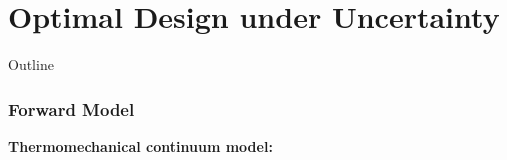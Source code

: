 \documentclass[10pt,xcolor=dvipsnames,compress]{beamer}
\begin{document}


\section{Optimal Design under Uncertainty}
\begin{frame}{Outline}
    \tableofcontents[currentsection]
\end{frame}
\begin{frame}
\frametitle{Forward Model} 
\footnotesize
\textbf{Thermomechanical continuum model:}\\


\end{frame}
\end{document}
